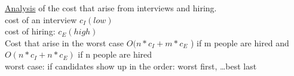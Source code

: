 \underline{Analysis} of the cost that arise from interviews and hiring.\\
cost of an interview $c{_I}(low)$\\
cost of hiring: $c{_E}(high)$\\
Cost that arise in the worst case $O(n* c{_I} +  m * c{_E}$ ) if m people are hired 
and \\
$O(n * c{_I} +  n *  c{_E} )$ if n people are hired \\
worst case: if candidates show up in the order: worst first, \ldots best last

